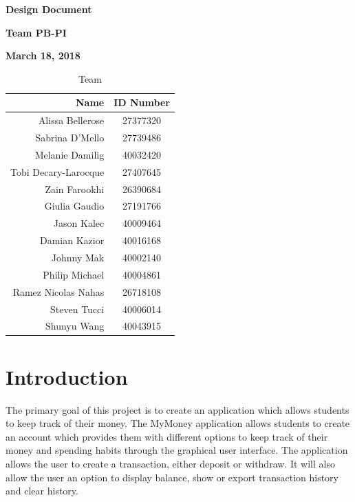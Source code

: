 \documentclass[12pt]{article}
\begin{document}
\vspace*{0.5in}
\centerline{\bf\Large Design Document}

\vspace*{0.5in}
\centerline{\bf\Large Team PB-PI}

\vspace*{0.5in}
\centerline{\bf\Large March 18, 2018}

\vspace*{1.5in}
\begin{table}[htbp]
\caption{Team}
\begin{center}
\begin{tabular}{|r | c|}
\hline
Name & ID Number \\
\hline\hline
Alissa Bellerose & 27377320 \\
Sabrina D'Mello & 27739486 \\
Melanie Damilig & 40032420 \\
Tobi Decary-Larocque & 27407645 \\
Zain Farookhi & 26390684 \\
Giulia Gaudio & 27191766 \\
Jason Kalec & 40009464 \\
Damian Kazior & 40016168 \\
Johnny Mak & 40002140 \\
Philip Michael & 40004861 \\
Ramez Nicolas Nahas & 26718108 \\
Steven Tucci & 40006014 \\
Shunyu Wang & 40043915 \\
\hline
\end{tabular}
\end{center}
\end{table}

\clearpage
\tableofcontents
\clearpage

\section{Introduction}
The primary goal of this project is to create an application which allows students to keep track of their money. The MyMoney application allows students to create an account which provides them with different options to keep track of their money and spending habits through the graphical user interface. The application allows the user to create a transaction, either deposit or withdraw. It will also allow the user an option to display balance, show or export transaction history and clear history. 
\end{document}
